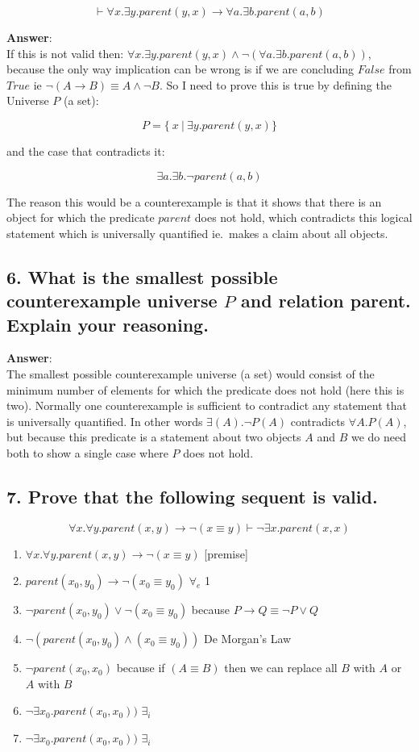 \documentclass[a4paper, 14pt]{report}
\newcommand{\answer}[1]{%
	\begin{flushleft}
		\textbf{Answer}:\\
			#1
	\end{flushleft}}
\newcommand{\question}[1]{\subsection*{#1}}
\begin{document}
\[ 
	\vdash \forall{x}.\exists{y}.parent(y, x) \rightarrow \forall{a}.\exists{b}.parent(a, b) 
\]

\answer{If this is not valid then:
	$ \forall{x}.\exists{y}.parent(y, x) \wedge \neg (\forall{a}.\exists{b}.parent(a, b)) $,
	because the only way implication can be wrong is if we are concluding
	$False$ from $True$ ie $ \neg (A \rightarrow B) \equiv A \wedge \neg B$.
	So I need to prove this is true by defining the Universe $P$ (a set):

	\[ P = \{\ x\ |\ \exists{y}.parent(y, x)\} \]

	and the case that contradicts it:

	\[ \exists{a}.\exists{b}.\neg parent(a, b) \]

	The reason this would be a counterexample is that it shows that
	there is an object for which the predicate $ parent $ does not hold,
	which contradicts this logical statement which is universally
	quantified ie.\ makes a claim about all objects.}

\pagebreak

\question{6. What is the smallest possible counterexample universe $ P $ and relation parent. Explain your reasoning.}

\answer{The smallest possible counterexample universe (a set) would consist
	of the minimum number of elements for which the predicate does not hold (here this is two). 
	Normally one counterexample  is sufficient to contradict any
  statement that is universally quantified. In other words $\exists(A).\neg P(A)$ 
  contradicts $\forall{A}.P(A)$, but because this predicate is a statement
  about two objects $A$ and $B$ we do need both to show a single case where
  $P$ does not hold.}

\question{7. Prove that the following sequent is valid.}

\[ \forall{x}.\forall{y}.parent(x, y) \rightarrow \neg(x \equiv y) \vdash \neg \exists{x}.parent(x, x) \]

\begin{enumerate}		
	\item $ \forall{x}.\forall{y}.parent(x, y) \rightarrow \neg(x \equiv y) $ [premise] \\
	\hline
	\item $ parent(x_0, y_0) \rightarrow \neg (x_0 \equiv y_0)  $ $ \forall_e $ 1
	\item $ \neg parent(x_0, y_0) \vee \neg (x_0 \equiv y_0) $  because $ P \rightarrow Q \equiv \neg P \vee Q $
  \item $ \neg (parent(x_0, y_0) \wedge (x_0 \equiv y_0)) $  De Morgan's Law 
	\item $ \neg parent(x_0, x_0) $  because if $ (A \equiv B ) $ then we can replace all $B$ with $A$ or $A$ with $B$ 
	\item $ \neg \exists{x_0}.parent(x_0, x_0)) $  $ \exists_i $ \\
	\hline
	\item $ \neg \exists{x_0}.parent(x_0, x_0)) $  $ \exists_i $
\end{enumerate}		
\end{document}

